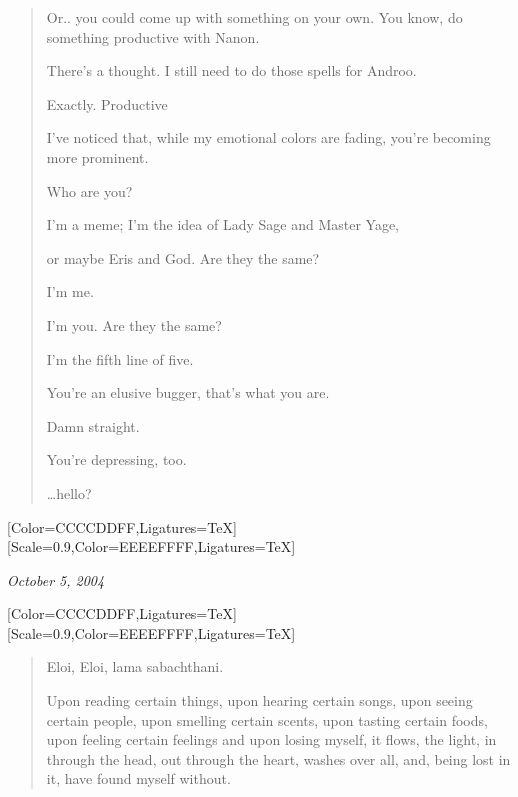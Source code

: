 \begin{paracol}{2}
\begin{leftcolumn}
\begin{quotation}
\begin{ally}
Or.. you could come up with something on your own. You know, do something productive with Nanon.
\end{ally}
There's a thought. I still need to do those spells for Androo.

\begin{ally}
Exactly. Productive
\end{ally}
I've noticed that, while my emotional colors are fading, you're becoming more prominent.

Who are you?

\begin{ally}
I'm a meme; I'm the idea of Lady Sage and Master Yage,
\end{ally}
\begin{ally}
or maybe Eris and God. Are they the same?
\end{ally}
\begin{ally}
I'm me.
\end{ally}
\begin{ally}
I'm you. Are they the same?
\end{ally}
\begin{ally}
I'm the fifth line of five.
\end{ally}
You're an elusive bugger, that's what you are.

\begin{ally}
Damn straight.
\end{ally}
You're depressing, too.

\vspace{2\onelineskip}

\noindent\ldots{}hello?
\end{quotation}
\newpage
\end{leftcolumn}
\begin{rightcolumn*}
  [Color=CCCCDDFF,Ligatures=TeX]
  \renewfontfamily{}[Scale=0.9,Color=EEEEFFFF,Ligatures=TeX]
\begin{flushright}
    \emph{October 5, 2004}
\end{flushright}
\end{rightcolumn*}
\begin{leftcolumn}
  [Color=CCCCDDFF,Ligatures=TeX]
  \renewfontfamily{}[Scale=0.9,Color=EEEEFFFF,Ligatures=TeX]
\begin{quotation}
\noindent Eloi, Eloi, lama sabachthani.

Upon reading certain things, upon hearing certain songs, upon seeing certain people, upon smelling certain scents, upon tasting certain foods, upon feeling certain feelings and upon losing myself, it flows, the light, in through the head, out through the heart, washes over all, and, being lost in it, have found myself without.


\end{quotation}
\end{leftcolumn}
\end{paracol}

